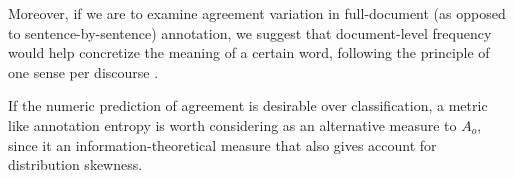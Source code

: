 \documentclass[11pt,a4paper]{article}
\begin{document}
Moreover, if we are to examine agreement variation in full-document (as opposed to sentence-by-sentence) annotation, we suggest that document-level frequency would help concretize the meaning of a certain word, following the principle of one sense per discourse \cite{Gale1992}.



If the numeric prediction of agreement is desirable over classification, a metric like annotation entropy \cite{Lopez2015} is worth considering as an alternative measure to $A_o$, since it an information-theoretical measure that also gives account for distribution skewness. %




\end{document}
